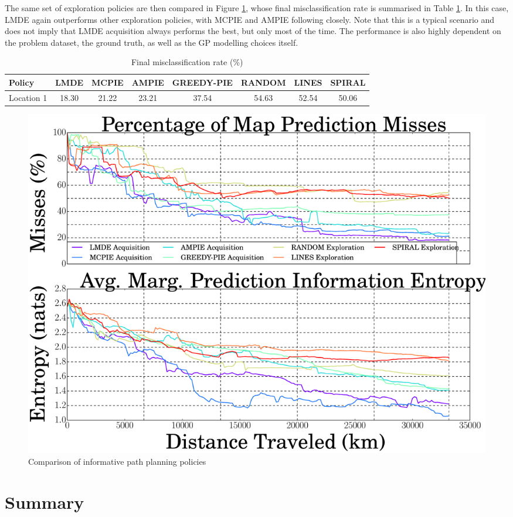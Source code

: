			The same set of exploration policies are then compared in Figure \ref{Figure:SerialCompareMethods}, whose final misclassification rate is summarised in Table \ref{Table:SerialCompareMethods}. In this case, LMDE again outperforms other exploration policies, with MCPIE and AMPIE following closely. Note that this is a typical scenario and does not imply that LMDE acquisition always performs the best, but only most of the time. The performance is also highly dependent on the problem dataset, the ground truth, as well as the GP modelling choices itself. 
		
			\begin{table}[t]
				{\footnotesize
				\begin{center}
					\begin{tabular}{ l c c c c c c c }
					\hline
					Policy & LMDE & MCPIE & AMPIE & GREEDY-PIE & RANDOM & LINES & SPIRAL \\
					\hline
					Location 1 & 18.30 & 21.22 & 23.21 & 37.54 & 54.63 & 52.54 & 50.06 \\
					\hline
					\end{tabular}
				\end{center}
				}
		  	\caption{Final misclassification rate (\%)}
		  	\label{Table:SerialCompareMethods}
		  	\end{table}	
		  					
			\begin{figure}[!htbp]
			\centering
				\includegraphics[width = 0.8\linewidth]{Figures/serial_compare_methods.eps}
			\caption{Comparison of informative path planning policies}
			\label{Figure:SerialCompareMethods}
			\end{figure}
								
	\section{Summary}